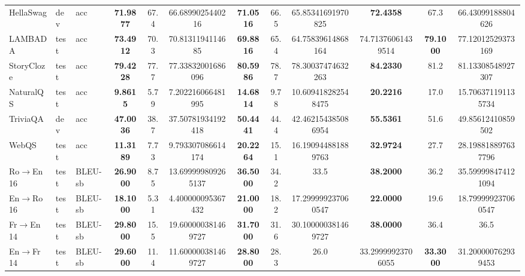 \documentclass{article}
\theoremstyle{definition}
\begin{document}
\begin{table}
\begin{tabular}{lllSSSSSSSSS}
\midrule

    HellaSwag & dev & acc &
    \bfseries 71.9877 & 67.4 & 66.6899025440216 &
    \bfseries 71.0516 & 66.5 & 65.85341691970825 &
    \bfseries 72.4358 & 67.3 & 66.43099188804626
    \\

    LAMBADA & test & acc &
    \bfseries 73.4912 & 70.3 & 70.8131194114685 &
    \bfseries 69.8816 & 65.4 & 64.75839614868164 &
    74.71376061439514 & \bfseries 79.1000 & 77.12012529373169
    \\

    StoryCloze & test & acc &
    \bfseries 79.4228 & 77.7 & 77.33832001686096 &
    \bfseries 80.5986 & 78.7 & 78.30037474632263 &
    \bfseries 84.2330 & 81.2 & 81.13308548927307
    \\

    NaturalQS & test & acc &
    \bfseries 9.8615 & 5.79 & 7.202216066481995 &
    \bfseries 14.6814 & 9.78 & 10.609418282548475 &
    \bfseries 20.2216 & 17.0 & 15.706371191135734
    \\

    TriviaQA & dev & acc &
    \bfseries 47.0036 & 38.7 & 37.50781934192418 &
    \bfseries 50.4441 & 44.4 & 42.462154385086954 &
    \bfseries 55.5361 & 51.6 & 49.85612410859502
    \\

    WebQS & test & acc &
    \bfseries 11.3189 & 7.73 & 9.793307086614174 &
    \bfseries 20.2264 & 15.1 & 16.190944881889763 &
    \bfseries 32.9724 & 27.7 & 28.198818897637796
    \\

    Ro$\to$En 16 & test & BLEU-sb &
    \bfseries 26.9000 & 8.75 & 13.699999809265137 &
    \bfseries 36.5000 & 34.2 & 33.5 &
    \bfseries 38.2000 & 36.2 & 35.599998474121094
    \\

    En$\to$Ro 16 & test & BLEU-sb &
    \bfseries 18.1000 & 5.31 & 4.400000095367432 &
    \bfseries 21.0000 & 18.2 & 17.299999237060547 &
    \bfseries 22.0000 & 19.6 & 18.799999237060547
    \\

    Fr$\to$En 14 & test & BLEU-sb &
    \bfseries 29.8000 & 15.5 & 19.600000381469727 &
    \bfseries 31.7000 & 31.6 & 30.100000381469727 &
    \bfseries 38.0000 & 36.4 & 36.5
    \\

    En$\to$Fr 14 & test & BLEU-sb &
    \bfseries 29.6000 & 11.4 & 11.600000381469727 &
    \bfseries 28.8000 & 28.3 & 26.0 &
    33.29999923706055 & \bfseries 33.3000 & 31.200000762939453
    \\


\end{tabular}
\end{table}
\end{document}
